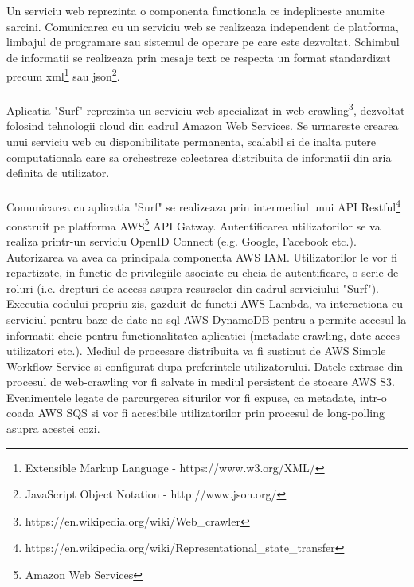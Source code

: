 \newcommand{\xmlDescription}{Extensible Markup Language - https://www.w3.org/XML/}
\newcommand{\jsonDescription}{JavaScript Object Notation - http://www.json.org/}
\newcommand{\crawlDescription}{https://en.wikipedia.org/wiki/Web\_crawler}

Un serviciu web reprezinta o componenta functionala ce indeplineste anumite sarcini. Comunicarea cu un serviciu web se realizeaza independent de platforma, limbajul de programare sau sistemul de operare pe care este dezvoltat. Schimbul de informatii se realizeaza prin mesaje text ce respecta un format standardizat precum xml\footnote{\xmlDescription} sau json\footnote{\jsonDescription}. 
\\
\\
Aplicatia "Surf" reprezinta un serviciu web specializat in web crawling\footnote{\crawlDescription}, dezvoltat folosind tehnologii cloud din cadrul Amazon Web Services. Se urmareste crearea unui serviciu web cu disponibilitate permanenta, scalabil si de inalta putere computationala care sa orchestreze colectarea distribuita de informatii din aria definita de utilizator.
\\
\\
Comunicarea cu aplicatia "Surf" se realizeaza prin intermediul unui API Restful\footnote{https://en.wikipedia.org/wiki/Representational\_state\_transfer} construit pe platforma AWS\footnote{Amazon Web Services} API Gatway. Autentificarea utilizatorilor se va realiza printr-un serviciu OpenID Connect (e.g. Google, Facebook etc.). Autorizarea va avea ca principala componenta AWS IAM. Utilizatorilor le vor fi repartizate, in functie de privilegiile asociate cu cheia de autentificare, o serie de roluri (i.e. drepturi de access asupra resurselor din cadrul serviciului "Surf"). Executia codului propriu-zis, gazduit de functii AWS Lambda, va interactiona cu serviciul pentru baze de date no-sql AWS DynamoDB pentru a permite accesul la informatii cheie pentru functionalitatea aplicatiei (metadate crawling, date acces utilizatori etc.). Mediul de procesare distribuita va fi sustinut de AWS Simple Workflow Service si configurat dupa preferintele utilizatorului. Datele extrase din procesul de web-crawling vor fi salvate in mediul persistent de stocare AWS S3. Evenimentele legate de parcurgerea siturilor vor fi expuse, ca metadate, intr-o coada AWS SQS si vor fi accesibile utilizatorilor prin procesul de long-polling asupra acestei cozi.
